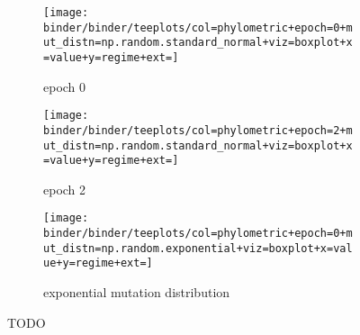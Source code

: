 \begin{figure*}
  \centering
  \begin{subfigure}[b]{\textwidth}
    \centering
    \texttt{[image: binder/binder/teeplots/col=phylometric+epoch=0+mut\_distn=np.random.standard\_normal+viz=boxplot+x=value+y=regime+ext=]}
    \caption{epoch 0}
    \label{fig:perfect-tree-phylometrics-sensitivity-analysis:epoch0}
  \end{subfigure}
  \begin{subfigure}[b]{\textwidth}
    \centering
    \texttt{[image: binder/binder/teeplots/col=phylometric+epoch=2+mut\_distn=np.random.standard\_normal+viz=boxplot+x=value+y=regime+ext=]}
    \caption{epoch 2}
    \label{fig:perfect-tree-phylometrics-sensitivity-analysis:epoch2}
  \end{subfigure}
  \begin{subfigure}[b]{\textwidth}
    \centering
    \texttt{[image: binder/binder/teeplots/col=phylometric+epoch=0+mut\_distn=np.random.exponential+viz=boxplot+x=value+y=regime+ext=]}
    \caption{exponential mutation distribution}
    \label{fig:perfect-tree-phylometrics-sensitivity-analysis:exponential}
  \end{subfigure}
  \caption{TODO}
  \label{fig:perfect-tree-phylometrics-sensitivity-analysis}
\end{figure*}
